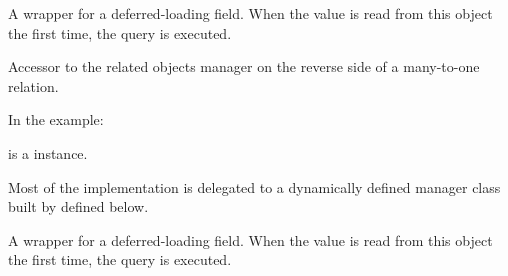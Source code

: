 \documentclass[letterpaper,10pt,english]{sphinxmanual}
\begin{document}
\begin{fulllineitems}
\begin{fulllineitems}
\label{\detokenize{QuChemPedIA.models:QuChemPedIA.models.UserModel.Utilisateur.last_name}}
A wrapper for a deferred-loading field. When the value is read from this
object the first time, the query is executed.

\end{fulllineitems}


\begin{fulllineitems}
\label{\detokenize{QuChemPedIA.models:QuChemPedIA.models.UserModel.Utilisateur.logentry_set}}
Accessor to the related objects manager on the reverse side of a
many-to-one relation.

In the example:

%
\begin{sphinxVerbatim}[commandchars=\\\{\}]
 
       
\end{sphinxVerbatim}

 is a  instance.

Most of the implementation is delegated to a dynamically defined manager
class built by  defined below.

\end{fulllineitems}


\begin{fulllineitems}
\label{\detokenize{QuChemPedIA.models:QuChemPedIA.models.UserModel.Utilisateur.number_of_upload_this_day}}
A wrapper for a deferred-loading field. When the value is read from this
object the first time, the query is executed.

\end{fulllineitems}


\end{fulllineitems}
\end{document}
